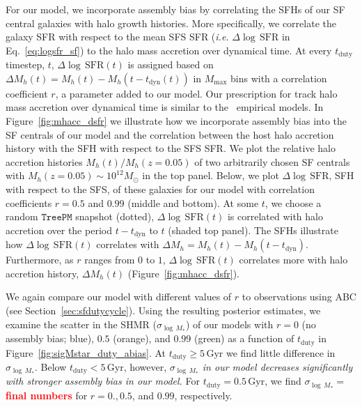 \documentclass[12pt, letterpaper, preprint, tighten]{aastex}
\newcommand{\todo}[1]{{\bf \textcolor{red}{#1}}}
\begin{document}
For our model, we incorporate assembly bias by correlating the SFHs of our SF 
central galaxies with halo growth histories. More specifically, we correlate the 
galaxy SFR with respect to the mean SFS SFR (\emph{i.e.} $\Delta\log\,\mathrm{SFR}$ 
in Eq.~\ref{eq:logsfr_sf}) to the halo mass accretion over dynamical time. At every 
$t_\mathrm{duty}$ timestep, $t$, $\Delta\log\,\mathrm{SFR}(t)$ is assigned based
on $\Delta M_h(t) = M_h(t) - M_h(t - t_\mathrm{dyn}(t))$ in $M_\mathrm{max}$ bins 
with a correlation coefficient $r$, a parameter added to our model. Our prescription 
for track halo mass accretion over dynamical time is similar to 
the~\cite{rodriguez-puebla2016,behroozi2018a} empirical models. In 
Figure~\ref{fig:mhacc_dsfr} we illustrate how we incorporate assembly bias into 
the SF centrals of our model and the correlation between the host halo accretion 
history with the SFH with respect to the SFS SFR. We plot the relative halo
accretion histories $M_h(t)/M_h(z{=}0.05)$ of two arbitrarily chosen SF centrals 
with $M_h(z{=}0.05)\sim10^{12}M_\odot$ in the top panel. Below, we plot 
$\Delta\log\,\mathrm{SFR}$, SFH with respect to the SFS, of these galaxies 
for our model with correlation coefficients $r=0.5$ and $0.99$ (middle and bottom). 
At some $t$, we choose a random $\mathtt{TreePM}$ snapshot (dotted), 
$\Delta\log\,\mathrm{SFR}(t)$ is correlated with halo accretion over the period 
$t - t_\mathrm{dyn}$ to $t$ (shaded top panel). The SFHs illustrate 
how $\Delta\log\,\mathrm{SFR}(t)$ correlates with $\Delta M_h = M_h(t) - M_h(t-t_\mathrm{dyn})$. 
Furthermore, as $r$ ranges from $0$ to $1$, $\Delta\log\,\mathrm{SFR}(t)$ correlates 
more with halo accretion history, $\Delta M_h(t)$ (Figure~\ref{fig:mhacc_dsfr}). 

We again compare our model with different values of $r$ to observations using 
ABC (see Section~\ref{sec:sfdutycycle}). Using the resulting posterior estimates, 
we examine the scatter in the SHMR ($\sigma_{\log\,M_*}$) of our models %
with $r=0$ (no assembly bias; blue), $0.5$ (orange), and $0.99$ (green) as a 
function of $t_\mathrm{duty}$ in Figure~\ref{fig:sigMstar_duty_abias}. At 
$t_\mathrm{duty} \geq 5\,\mathrm{Gyr}$ we find little difference in $\sigma_{\log\,M_*}$.
Below $t_\mathrm{duty} < 5\,\mathrm{Gyr}$, however, \emph{$\sigma_{\log\,M_*}$ in 
our model decreases significantly with stronger assembly bias in our model.} 
For $t_\mathrm{duty} = 0.5\,\mathrm{Gyr}$, we find $\sigma_{\log\,M_*} = $
\todo{final numbers} for $r = 0., 0.5$, and $0.99$, respectively. 
\end{document}
